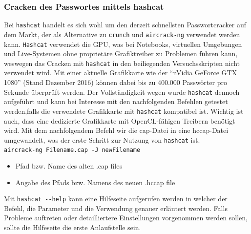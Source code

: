 	\subsubsection{Cracken des Passwortes mittels hashcat}
	Bei \colorbox{altgray}{\lstinline|hashcat|} handelt es sich wohl um den derzeit schnellsten Passwortcracker auf dem Markt, der als Alternative zu \colorbox{altgray}{\lstinline|crunch|} und \colorbox{altgray}{\lstinline|aircrack-ng|} verwendet werden kann.  \colorbox{altgray}{\lstinline|Hashcat|} verwendet die GPU, was bei Notebooks, virtuellen Umgebungen und Live-Systemen ohne proprietäre Grafiktreiber zu Problemen führen kann, weswegen das Cracken mit \colorbox{altgray}{\lstinline|hashcat|} in den beiliegenden Versuchsskripten nicht verwendet wird. Mit einer aktuelle Grafikkarte wie der "`nVidia GeForce GTX 1080"' (Stand Dezember 2016) können dabei bis zu 400.000 Passwörter pro Sekunde überprüft werden. Der Vollständigkeit wegen wurde \colorbox{altgray}{\lstinline|hashcat|} dennoch aufgeführt und kann bei Interesse mit den nachfolgenden Befehlen getestet werden,falls die verwendete Grafikkarte mit \colorbox{altgray}{\lstinline|hashcat|} kompatibel ist. Wichtig ist auch, dass eine dedizierte Grafikkarte mit OpenCL-fähigen Treibern benötigt wird.\newline
Mit dem nachfolgendem Befehl wir die cap-Datei in eine hccap-Datei umgewandelt, was der erste Schritt zur Nutzung von \colorbox{altgray}{\lstinline|hashcat|} ist.\newline
	\\
	\colorbox{altgray}{\lstinline|aircrack-ng Filename.cap -J newFilename|}
	\begin{itemize}
		\item {} Pfad bzw. Name des alten .cap files
		\item {} Angabe des Pfads bzw. Namens des neuen .hccap file
	\end{itemize}
	Mit \colorbox{altgray}{\lstinline|hashcat --help|} kann eine Hilfeseite aufgerufen werden in welcher der Befehl, die Parameter und die Verwendung genauer erläutert werden. Falls Probleme auftreten oder detailliertere Einstellungen vorgenommen werden sollen, sollte die Hilfeseite die erste Anlaufstelle sein.

